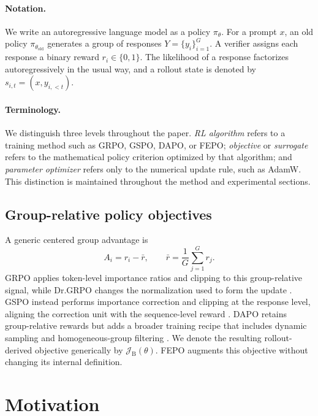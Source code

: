 \documentclass{article}
\newcommand{\FEPO}{\textsc{FEPO}\xspace}
\begin{document}
\paragraph{Notation.}
We write an autoregressive language model as a policy $\pi_\theta$. For a prompt $x$, an old policy $\pi_{\theta_{\mathrm{old}}}$ generates a group of responses $Y=\{y_i\}_{i=1}^{G}$. A verifier assigns each response a binary reward $r_i\in\{0,1\}$. The likelihood of a response factorizes autoregressively in the usual way, and a rollout state is denoted by $s_{i,t}=(x,y_{i,<t})$.

\paragraph{Terminology.}
We distinguish three levels throughout the paper. \emph{RL algorithm} refers to a training method such as GRPO, GSPO, DAPO, or \FEPO; \emph{objective} or \emph{surrogate} refers to the mathematical policy criterion optimized by that algorithm; and \emph{parameter optimizer} refers only to the numerical update rule, such as AdamW. This distinction is maintained throughout the method and experimental sections.

\subsection{Group-relative policy objectives}
A generic centered group advantage is
\begin{equation}
A_i=r_i-\bar r,
\qquad
\bar r=\frac{1}{G}\sum_{j=1}^{G}r_j.
\label{eq:centered_adv}
\end{equation}
GRPO applies token-level importance ratios and clipping to this group-relative signal, while Dr.GRPO changes the normalization used to form the update \citep{deepseekmath2024,liu2025understanding}. GSPO instead performs importance correction and clipping at the response level, aligning the correction unit with the sequence-level reward \citep{zheng2025gspo}. DAPO retains group-relative rewards but adds a broader training recipe that includes dynamic sampling and homogeneous-group filtering \citep{yu2025dapo}. We denote the resulting rollout-derived objective generically by $\mathcal J_{\mathrm B}(\theta)$. \FEPO augments this objective without changing its internal definition.

\section{Motivation}
\label{sec:motivation}
\end{document}
